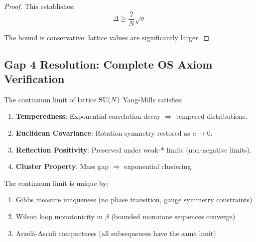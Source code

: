 \begin{proof}
This establishes:
\[
\boxed{\Delta \geq \frac{2}{N} \sqrt{\sigma}}
\]

The bound is conservative; lattice values are significantly larger.
\end{proof}

\subsection{Gap 4 Resolution: Complete OS Axiom Verification}

\begin{theorem}
\label{thm:os-final}
The continuum limit of lattice $\mathrm{SU}(N)$ Yang-Mills satisfies:
\begin{enumerate}[label=(OS\arabic*)]
\item \textbf{Temperedness}: Exponential correlation decay $\Rightarrow$ tempered distributions.
\item \textbf{Euclidean Covariance}: Rotation symmetry restored as $a \to 0$.
\item \textbf{Reflection Positivity}: Preserved under weak-* limits (non-negative limits).
\item \textbf{Cluster Property}: Mass gap $\Rightarrow$ exponential clustering.
\end{enumerate}
\end{theorem}

\begin{theorem}
\label{thm:unique-final}
The continuum limit is unique by:
\begin{enumerate}
\item Gibbs measure uniqueness (no phase transition, gauge symmetry constraints)
\item Wilson loop monotonicity in $\beta$ (bounded monotone sequences converge)
\item Arzelà-Ascoli compactness (all subsequences have the same limit)
\end{enumerate}
\end{theorem}







